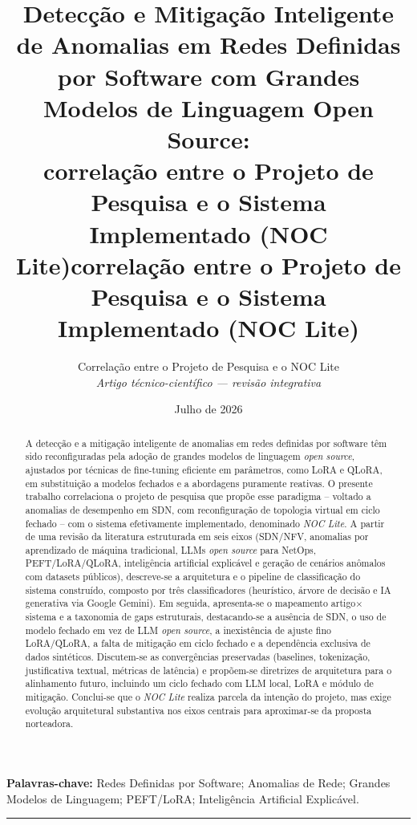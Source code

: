 \documentclass[12pt,a4paper]{article}
\title{\textbf{Detecção e Mitigação Inteligente de Anomalias em Redes
Definidas por Software com Grandes Modelos de Linguagem Open Source:\\
correlação entre o Projeto de Pesquisa e o Sistema Implementado (NOC Lite)}correlação entre o Projeto de Pesquisa e o Sistema Implementado (NOC Lite)}}
\author{Correlação entre o Projeto de Pesquisa e o NOC Lite\\[2mm]\textit{Artigo técnico-científico — revisão integrativa}}
\date{Julho de 2026}
\begin{document}
\maketitle

\begin{abstract}
A detecção e a mitigação inteligente de anomalias em redes definidas por
software têm sido reconfiguradas pela adoção de grandes modelos de
linguagem \textit{open source}, ajustados por técnicas de fine-tuning
eficiente em parâmetros, como LoRA e QLoRA, em substituição a modelos
fechados e a abordagens puramente reativas. O presente trabalho correlaciona
o projeto de pesquisa que propõe esse paradigma -- voltado a anomalias de
desempenho em SDN, com reconfiguração de topologia virtual em ciclo fechado
-- com o sistema efetivamente implementado, denominado \textit{NOC Lite}.
A partir de uma revisão da literatura estruturada em seis eixos (SDN/NFV,
anomalias por aprendizado de máquina tradicional, LLMs \textit{open source}
para NetOps, PEFT/LoRA/QLoRA, inteligência artificial explicável e
geração de cenários anômalos com datasets públicos), descreve-se a
arquitetura e o pipeline de classificação do sistema construído, composto
por três classificadores (heurístico, árvore de decisão e IA generativa
via Google Gemini). Em seguida, apresenta-se o mapeamento
artigo$\times$sistema e a taxonomia de gaps estruturais, destacando-se a
ausência de SDN, o uso de modelo fechado em vez de LLM \textit{open
source}, a inexistência de ajuste fino LoRA/QLoRA, a falta de mitigação em
ciclo fechado e a dependência exclusiva de dados sintéticos. Discutem-se as
convergências preservadas (baselines, tokenização, justificativa textual,
métricas de latência) e propõem-se diretrizes de arquitetura para o
alinhamento futuro, incluindo um ciclo fechado com LLM local, LoRA e módulo
de mitigação. Conclui-se que o \textit{NOC Lite} realiza parcela da
intenção do projeto, mas exige evolução arquitetural substantiva nos eixos
centrais para aproximar-se da proposta norteadora.
\end{abstract}

\noindent\textbf{Palavras-chave:} Redes Definidas por Software; Anomalias de
Rede; Grandes Modelos de Linguagem; PEFT/LoRA; Inteligência Artificial
Explicável.

\vspace{6pt}
\hrule
\vspace{10pt}

\end{document}
